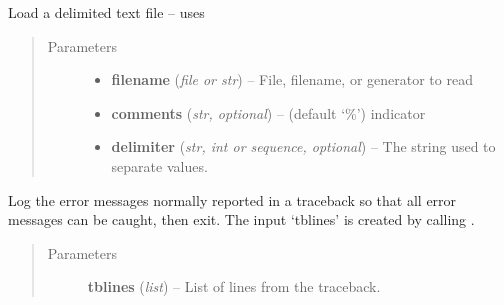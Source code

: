\documentclass[letterpaper,10pt,english]{sphinxmanual}
\begin{document}
\begin{fulllineitems}
\label{docs/utilities:utilities.files.fl_load_file}
Load a delimited text file -- uses 
\begin{quote}\begin{description}
\item[{Parameters}] \leavevmode\begin{itemize}
\item {} 
\textbf{filename} (\emph{file or str}) -- File, filename, or generator to read

\item {} 
\textbf{comments} (\emph{str, optional}) -- (default `\%') indicator

\item {} 
\textbf{delimiter} (\emph{str, int or sequence, optional}) -- The string used to separate values.

\end{itemize}

\end{description}\end{quote}

\end{fulllineitems}



\begin{fulllineitems}
\label{docs/utilities:utilities.files.fl_log_fatal_error}
Log the error messages normally reported in a traceback so that
all error messages can be caught, then exit. The input `tblines'
is created by calling .
\begin{quote}\begin{description}
\item[{Parameters}] \leavevmode
\textbf{tblines} (\emph{list}) -- List of lines from the traceback.

\end{description}\end{quote}

\end{fulllineitems}


\end{document}

